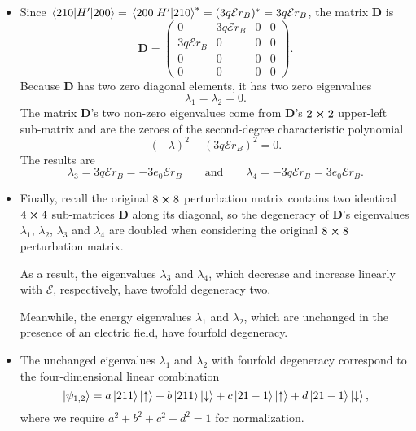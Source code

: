 \documentclass[11pt, a4paper]{article}
\newcommand{\eqtext}[1]{\qquad \text{#1} \qquad}
\newcommand{\mat}[1]{\mathbf{#1}} %
\newcommand{\p}{\psi}  %
\newcommand{\E}{\mathcal{E}}  %
\newcommand{\ua}{\uparrow}  %
\newcommand{\da}{\downarrow}  %
\begin{document}
\begin{itemize}
	\item Since $ \mel{210}{H'}{200} = \mel{200}{H'}{210}^{*} = (3q\E r_{B})^{*} = 3q\E r_{B}  $, the matrix $ \mat{D} $ is
	\begin{equation*}
		\mat{D} =
		\begin{pmatrix}
			0 & 3q\E r_{B} & 0 & 0\\
			3q\E r_{B} & 0 & 0 & 0\\
			0 & 0 & 0 & 0 \\
			0 & 0 & 0 & 0
		\end{pmatrix}.
	\end{equation*}
	Because $ \mat{D}  $ has two zero diagonal elements, it has two zero eigenvalues
	\begin{equation*}
		\lambda_{1} = \lambda_{2} = 0.
	\end{equation*}
	The matrix $ \mat{D} $'s two non-zero eigenvalues come from $ \mat{D} $'s $ 2 \cross 2 $ upper-left sub-matrix and are the zeroes of the second-degree characteristic polynomial
	\begin{equation*}
		(- \lambda)^{2} - (3 q \E r_{B})^{2} = 0.
	\end{equation*}
	The results are
	\begin{equation*}
		\lambda_{3} = 3q\E r_{B} = -3e_{0}\E r_{B} \eqtext{and} \lambda_{4} = -3q\E r_{B} = 3e_{0}\E r_{B}.
	\end{equation*}
	
	\item Finally, recall the original $ 8 \cross 8 $ perturbation matrix contains two identical $ 4 \cross 4 $ sub-matrices $ \mat{D} $ along its diagonal, so the degeneracy of $ \mat{D} $'s eigenvalues $ \lambda_{1} $, $ \lambda_{2} $, $ \lambda_{3} $ and $ \lambda_{4} $ are doubled when considering the original $ 8 \cross 8 $ perturbation matrix.
	
	As a result, the eigenvalues $ \lambda_{3} $ and $ \lambda_{4} $, which decrease and increase linearly with $ \E $, respectively, have twofold degeneracy two. 
	
	Meanwhile, the energy eigenvalues $ \lambda_{1} $ and $ \lambda_{2} $, which are unchanged in the presence of an electric field, have fourfold degeneracy.
	
	\item The unchanged eigenvalues $ \lambda_{1} $ and $ \lambda_{2} $ with fourfold degeneracy correspond to the four-dimensional linear combination
	\begin{equation*}
		\ket{\p_{1,2}} = a \ket{211}\ket{\ua} + b \ket{211}\ket{\da} + c \ket{21-1}\ket{\ua} + d \ket{21-1}\ket{\da},
	\end{equation*}
	where we require $ a^{2} + b^{2} + c^{2} + d^{2} = 1 $ for normalization.
	

\end{itemize}
\end{document}
